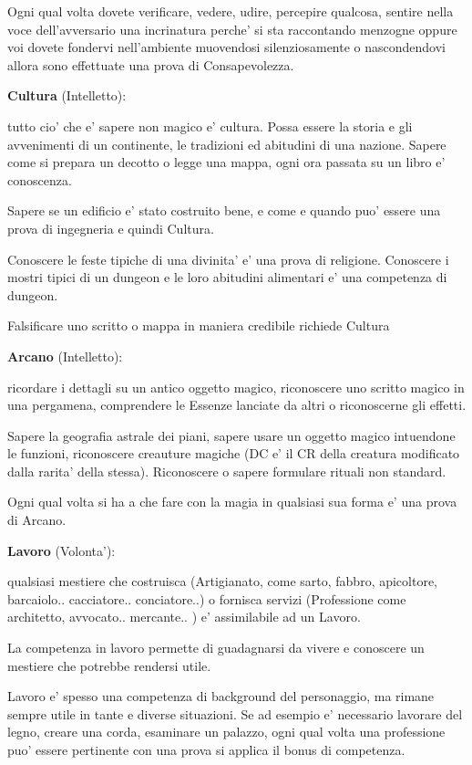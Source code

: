 \documentclass[a4paper,11pt,twoside,openany]{book}
\begin{document}
	Ogni qual volta dovete verificare, vedere, udire, percepire qualcosa, sentire nella voce dell'avversario una incrinatura perche' si sta raccontando menzogne oppure voi dovete fondervi nell'ambiente muovendosi silenziosamente o nascondendovi allora sono effettuate una prova di Consapevolezza.
	
	\textbf{Cultura} (Intelletto):
	
	tutto cio' che e' sapere non magico e' cultura. Possa essere la storia e gli avvenimenti di un continente, le tradizioni ed abitudini di una nazione. Sapere come si prepara un decotto o legge una mappa, ogni ora passata su un libro e' conoscenza.
	
	Sapere se un edificio e' stato costruito bene, e come e quando puo' essere una prova di ingegneria e quindi Cultura.
	
	Conoscere le feste tipiche di una divinita' e' una prova di religione. Conoscere i mostri tipici di un dungeon e le loro abitudini alimentari e' una competenza di dungeon.
	
	Falsificare uno scritto o mappa in maniera credibile richiede Cultura
	
	\textbf{Arcano} (Intelletto):
	
	ricordare i dettagli su un antico oggetto magico, riconoscere uno scritto magico in una pergamena, comprendere le Essenze lanciate da altri o riconoscerne gli effetti.
	
	Sapere la geografia astrale dei piani, sapere usare un oggetto magico intuendone le funzioni, riconoscere creauture magiche (DC e' il CR della creatura modificato dalla rarita' della stessa). Riconoscere o sapere formulare rituali non standard.
	
	Ogni qual volta si ha a che fare con la magia in qualsiasi sua forma e' una prova di Arcano.
	
	\textbf{Lavoro} (Volonta'):
	
	qualsiasi mestiere che costruisca (Artigianato, come sarto, fabbro, apicoltore, barcaiolo.. cacciatore.. conciatore..) o fornisca servizi (Professione come architetto, avvocato.. mercante.. ) e' assimilabile ad un Lavoro.
	
	La competenza in lavoro permette di guadagnarsi da vivere e conoscere un mestiere che potrebbe rendersi utile.
	
	Lavoro e' spesso una competenza di background del personaggio, ma rimane sempre utile in tante e diverse situazioni. Se ad esempio e' necessario lavorare del legno, creare una corda, esaminare un palazzo, ogni qual volta una professione puo' essere pertinente con una prova si applica il bonus di competenza.
	
\end{document}
